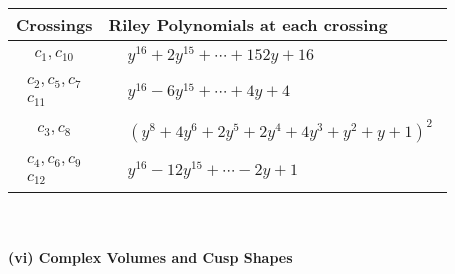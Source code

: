 \documentclass[1p]{elsarticle_modified}
\theoremstyle{definition}
\begin{document}
\begin{tabular}{m{50pt}|m{274pt}}
Crossings & \hspace{64pt}Riley Polynomials at each crossing \\
\hline $$\begin{aligned}c_{1},c_{10}\end{aligned}$$&$\begin{aligned}
&y^{16}+2 y^{15}+\cdots+152 y+16
\end{aligned}$\\
\hline $$\begin{aligned}c_{2},c_{5},c_{7}\\c_{11}\end{aligned}$$&$\begin{aligned}
&y^{16}-6 y^{15}+\cdots+4 y+4
\end{aligned}$\\
\hline $$\begin{aligned}c_{3},c_{8}\end{aligned}$$&$\begin{aligned}
&(y^8+4 y^6+2 y^5+2 y^4+4 y^3+y^2+y+1)^2
\end{aligned}$\\
\hline $$\begin{aligned}c_{4},c_{6},c_{9}\\c_{12}\end{aligned}$$&$\begin{aligned}
&y^{16}-12 y^{15}+\cdots-2 y+1
\end{aligned}$\\
\hline
\end{tabular}\\~\\
\newpage\flushleft \textbf{(vi) Complex Volumes and Cusp Shapes}
\end{document}
